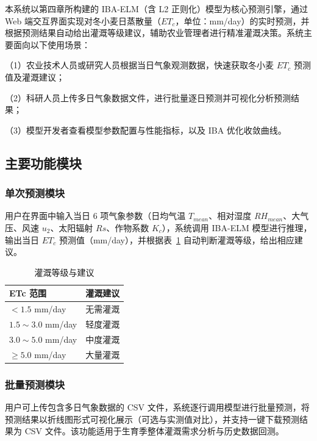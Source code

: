 \documentclass[11pt]{article}
\begin{document}
本系统以第四章所构建的 IBA-ELM（含 L2 正则化）模型为核心预测引擎，通过 Web 端交互界面实现对冬小麦日蒸散量（$ET_c$，单位：mm/day）的实时预测，并根据预测结果自动给出灌溉等级建议，辅助农业管理者进行精准灌溉决策。系统主要面向以下使用场景：

（1）农业技术人员或研究人员根据当日气象观测数据，快速获取冬小麦 $ET_c$ 预测值及灌溉建议；

（2）科研人员上传多日气象数据文件，进行批量逐日预测并可视化分析预测结果；

（3）模型开发者查看模型参数配置与性能指标，以及 IBA 优化收敛曲线。

\subsection{主要功能模块}
\label{sec:sys_modules}

\subsubsection{单次预测模块}
\label{subsec:single_predict}

用户在界面中输入当日 6 项气象参数（日均气温 $T_{mean}$、相对湿度 $RH_{mean}$、大气压、风速 $u_2$、太阳辐射 $Rs$、作物系数 $K_c$），系统调用 IBA-ELM 模型进行推理，输出当日 $ET_c$ 预测值（mm/day），并根据表~\ref{tab:irrigation_level} 自动判断灌溉等级，给出相应建议。

\begin{table}[htbp]
\centering
\caption{灌溉等级与建议}
\label{tab:irrigation_level}
\begin{tabular}{lc}
\toprule
ETc 范围 & 灌溉建议 \\
\midrule
$< 1.5$ mm/day   & 无需灌溉 \\
$1.5 \sim 3.0$ mm/day & 轻度灌溉 \\
$3.0 \sim 5.0$ mm/day & 中度灌溉 \\
$\geq 5.0$ mm/day     & 大量灌溉 \\
\bottomrule
\end{tabular}
\end{table}

\subsubsection{批量预测模块}
\label{subsec:batch_predict}

用户可上传包含多日气象数据的 CSV 文件，系统逐行调用模型进行批量预测，将预测结果以折线图形式可视化展示（可选与实测值对比），并支持一键下载预测结果为 CSV 文件。该功能适用于生育季整体灌溉需求分析与历史数据回测。
\end{document}
